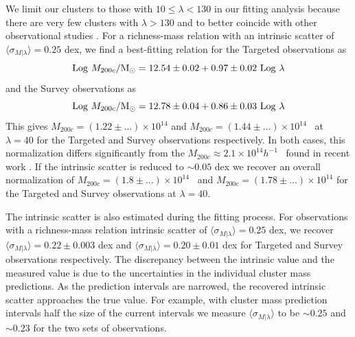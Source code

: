\documentclass[fleqn,usenatbib]{mnras}
\begin{document}
We limit our clusters to those with $10 \leq \lambda < 130$ in our fitting analysis because there are very few clusters with $\lambda>130$ and to better coincide with other observational studies . For a richness-mass relation with an intrinsic scatter of $\langle \sigma_{M|\lambda} \rangle = 0.25$ dex, we find a best-fitting relation for the Targeted observations as
\begin{equation}
	\mathrm{Log}\ M_{200c}/\hbox{$\mathrm{M}_\odot$} = 12.54\pm0.02 + 0.97\pm0.02\ \mathrm{Log}\ \lambda
\end{equation} 
and the Survey observations as
\begin{equation}
	\mathrm{Log}\ M_{200c}/\Msol = 12.78\pm0.04 + 0.86\pm0.03\ \mathrm{Log}\ \lambda
\end{equation} 
This gives $M_{200c} = (1.22\pm...)\times10^{14}$ \Msol and $M_{200c} = (1.44\pm...)\times10^{14}$ \Msol\ at $\lambda=40$ for the Targeted and Survey observations respectively. In both cases, this normalization differs significantly from the $M_{200c} \approx 2.1\times10^{14} h^{-1}$ \Msol\ found in recent work \cite{Li2016, Simet2016}. If the intrinsic scatter is reduced to $\sim 0.05$ dex we recover an overall normalization of $M_{200c} = (1.8\pm...)\times10^{14}$ \Msol\ and $M_{200c} = (1.78\pm...)\times10^{14}$ for the Targeted and Survey observations at $\lambda=40$.

The intrinsic scatter is also estimated during the fitting process. For observations with a richness-mass relation intrinsic scatter of $\langle \sigma_{M|\lambda} \rangle = 0.25$ dex, we recover $\langle \sigma_{M|\lambda} \rangle = 0.22\pm0.003$ dex and $\langle \sigma_{M|\lambda} \rangle = 0.20\pm0.01$ dex for Targeted and Survey observations respectively. The discrepancy between the intrinsic value and the measured value is due to the uncertainties in the individual cluster mass predictions. As the prediction intervals are narrowed, the recovered intrinsic scatter approaches the true value. For example, with cluster mass prediction intervals half the size of the current intervals we measure $\langle \sigma_{M|\lambda} \rangle$ to be $\sim 0.25$ and $\sim 0.23$ for the two sets of observations.
\end{document}

